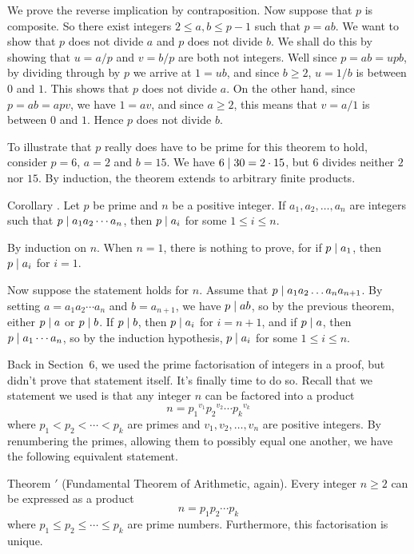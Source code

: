 We prove the reverse implication by contraposition.
Now suppose that $p$ is composite. So there exist integers $2\le a,b\le p-1$
such that $p=ab$. We want to show that $p$ does not divide $a$ and $p$ does not divide $b$.
We shall do this by showing that $u = a/p$ and $v = b/p$ are both not integers. Well
since $p = ab = upb$, by dividing through by $p$ we arrive at
$1 = ub$, and since $b\ge 2$, $u = 1/b$ is between $0$ and $1$. This shows that $p$ does
not divide $a$. On the other hand, since $p = ab = apv$, we have $1 = av$,
and since $a\ge 2$, this means that $v = a/1$ is between $0$ and $1$. Hence
$p$ does not divide $b$.\slug

To illustrate that $p$ really does have to be prime for this theorem to hold, consider
$p=6$, $a = 2$ and $b=15$. We have $6 \mid 30 = 2\cdot 15$, but $6$ divides neither $2$ nor $15$.
By induction, the theorem extends to arbitrary finite products.

\proclaim Corollary \advthm. Let $p$ be prime and $n$ be a positive integer. If $a_1,a_2,\ldots,a_n$
are integers such that $p \mid a_1a_2\cdots a_n$, then $p\mid a_i$ for some
$1\le i\le n$.

\proof By induction on $n$. When $n=1$, there is nothing to prove,
for if $p\mid a_1$, then $p\mid a_i$ for $i = 1$.

Now suppose the statement holds for $n$. Assume that $p\mid a_1a_2\ldots a_n a_{n+1}$.
By setting $a = a_1a_2\cdots a_n$ and $b=a_{n+1}$, we have $p\mid ab$, so by the previous theorem,
either $p\mid a$ or $p\mid b$. If $p\mid b$, then $p\mid a_i$ for $i=n+1$,
and if $p\mid a$, then $p\mid a_1\cdots a_n$, so by the induction hypothesis,
$p\mid a_i$ for some $1\le i\le n$.\slug

Back in Section~6, we used the prime factorisation of integers in a proof, but didn't prove
that statement itself. It's finally time to do so. Recall that we statement we used
is that any integer $n$ can be factored into a product
$$n = {p_1}^{v_1} {p_2}^{v_2} \cdots {p_k}^{v_k}$$
where $p_1 < p_2<\cdots<p_k$ are primes and $v_1,v_2,\ldots,v_n$ are positive integers. By renumbering
the primes, allowing them to possibly equal one another, we have the following equivalent statement.

\parenproclaim Theorem {\thmfta}$'$ (Fundamental Theorem of Arithmetic, again). Every integer
$n\ge 2$ can be expressed as a product
$$n = p_1p_2\cdots p_k$$
where $p_1\le p_2\le \cdots \le p_k$ are prime numbers. Furthermore, this factorisation
is unique.

